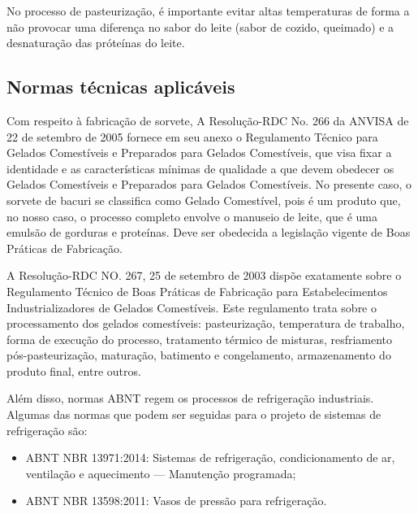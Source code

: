 \documentclass[10pt,a4paper]{article}
\begin{document}
No processo de pasteurização, é importante evitar altas temperaturas de forma a não provocar uma diferença no sabor do leite (sabor de cozido, queimado) e a desnaturação das próteínas do leite.

\subsection{{ Normas técnicas aplicáveis}}


Com respeito à fabricação de sorvete, A Resolução-RDC No. 266 da ANVISA de 22 de setembro de 2005 fornece em seu anexo o Regulamento Técnico para Gelados Comestíveis e Preparados para Gelados Comestíveis, que visa fixar a identidade e as características mínimas de qualidade a que devem obedecer os Gelados Comestíveis e Preparados para Gelados Comestíveis. No presente caso, o sorvete de bacuri se classifica como Gelado Comestível, pois é um produto que, no nosso caso, o processo completo envolve o manuseio de leite, que é uma emulsão de gorduras e proteínas. Deve ser obedecida a legislação vigente de Boas Práticas de Fabricação. %

A Resolução-RDC NO. 267, 25 de setembro de 2003 dispõe exatamente sobre o Regulamento Técnico de Boas Práticas de Fabricação para Estabelecimentos Industrializadores de Gelados Comestíveis. Este regulamento trata sobre o processamento dos gelados comestíveis: pasteurização, temperatura de trabalho, forma de execução do processo, tratamento térmico de misturas, resfriamento pós-pasteurização, maturação, batimento e congelamento, armazenamento do produto final, entre outros. %

Além disso, normas ABNT regem os processos de refrigeração industriais. Algumas das normas que podem ser seguidas para o projeto de sistemas de refrigeração são:
\begin{itemize}
    \item ABNT NBR 13971:2014: Sistemas de refrigeração, condicionamento de ar, ventilação e aquecimento — Manutenção programada;
    \item ABNT NBR 13598:2011: Vasos de pressão para refrigeração.
\end{itemize}
\end{document}
